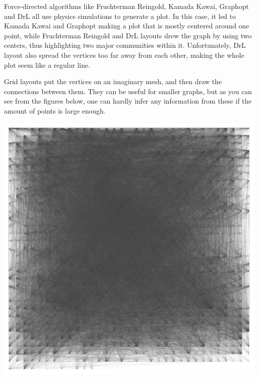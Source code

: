 \documentclass[12pt, a4paper]{article}
\begin{document}
Force-directed algorithms like Fruchterman Reingold, Kamada Kawai, Graphopt and DrL  all use physics simulations to generate a plot. In this case, it led to Kamada Kawai and Graphopt making a plot that is mostly centered around one point, while Fruchterman Reingold and DrL layouts drew the graph by using two centers, thus highlighting two major communities within it. Unfortunately, DrL layout also spread the vertices too far away from each other, making the whole plot seem like a regular line.

Grid layouts put the vertices on an imaginary mesh, and then draw the connections between them. They can be useful for smaller graphs, but as you can see from the figures below, one can hardly infer any information from these if the amount of points is large enough.

\begin{multicols}{2}
  {\centering
  \includegraphics[width=\columnwidth]{src/youtube/hdg/comp/3_plot_grd}\\
  \label{fig:hdg_c3}}
  {\centering
}
\end{multicols}
\end{document}
